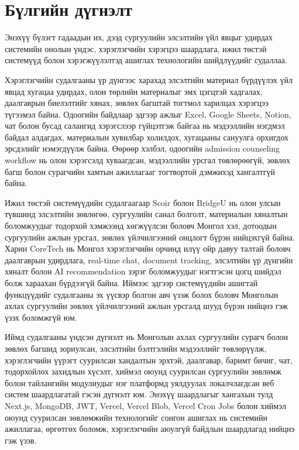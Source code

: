 
\section{Бүлгийн дүгнэлт}

Энэхүү бүлэгт гадаадын их, дээд сургуулийн элсэлтийн үйл явцыг удирдах
системийн онолын үндэс, хэрэглэгчийн хэрэгцээ шаардлага, ижил төстэй
системүүд болон хэрэгжүүлэлтэд ашиглах технологийн шийдлүүдийг судаллаа.

Хэрэглэгчийн судалгааны үр дүнгээс харахад элсэлтийн материал бүрдүүлэх
үйл явцад хугацаа удирдах, олон төрлийн материалыг эмх цэгцтэй хадгалах,
даалгаврын биелэлтийг хянах, зөвлөх багштай тогтмол харилцах хэрэгцээ
түгээмэл байна. Одоогийн байдлаар эдгээр ажлыг Excel, Google Sheets, Notion,
чат болон бусад салангид хэрэгслээр гүйцэтгэж байгаа нь мэдээллийн
нэгдмэл байдал алдагдах, материалын хувилбар холилдох, хугацааны сануулга
орхигдох эрсдэлийг нэмэгдүүлж байна. Өөрөөр хэлбэл, одоогийн admission
counseling workflow нь олон хэрэгсэлд хуваагдсан, мэдээллийн урсгал
төвлөрөөгүй, зөвлөх багш болон сурагчийн хамтын ажиллагааг тогтвортой
дэмжихэд хангалтгүй байна.

Ижил төстэй системүүдийн судалгаагаар Scoir болон BridgeU нь олон улсын
түвшинд элсэлтийн зөвлөгөө, сургуулийн санал болголт, материалын хяналтын
боломжуудыг тодорхой хэмжээнд хөгжүүлсэн боловч Монгол хэл, дотоодын
сургуулийн ажлын урсгал, зөвлөх үйлчилгээний онцлогт бүрэн нийцэхгүй
байна. Харин CoreTech нь Монгол хэрэглэгчийн орчинд илүү ойр давуу талтай
боловч даалгаврын удирдлага, real-time chat, document tracking, элсэлтийн
үр дүнгийн хяналт болон AI recommendation зэрэг боломжуудыг нэгтгэсэн
цогц шийдэл болж хараахан бүрдээгүй байна. Иймээс эдгээр системүүдийн
ашигтай функцүүдийг судалгааны эх үүсвэр болгон авч үзэж болох боловч
Монголын ахлах сургуулийн зөвлөх үйлчилгээний ажлын урсгалд шууд бүрэн
нийцнэ гэж үзэх боломжгүй юм.

Иймд судалгааны үндсэн дүгнэлт нь Монголын ахлах сургуулийн сурагч болон
зөвлөх багшид зориулсан, элсэлтийн бэлтгэлийн мэдээллийг төвлөрүүлж,
хэрэглэгчийн үүрэгт суурилсан хандалтын эрхтэй, даалгавар, баримт бичиг,
чат, тодорхойлох захидлын хүсэлт, хиймэл оюунд суурилсан сургуулийн
зөвлөмж болон тайлангийн модулиудыг нэг платформд уялдуулах локалчлагдсан
веб систем шаардлагатай гэсэн дүгнэлт юм. Энэхүү шаардлагыг хангахын тулд
Next.js, MongoDB, JWT, Vercel, Vercel Blob, Vercel Cron Jobs болон хиймэл
оюунд суурилсан зөвлөмжийн технологийг сонгон ашиглах нь системийн ажиллагаа,
өргөтгөх боломж, хэрэглэгчийн аюулгүй байдлын шаардлагад нийцнэ гэж үзэв.
